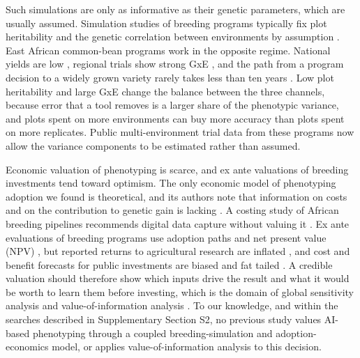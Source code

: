 Such simulations are only as informative as their genetic parameters, which are usually assumed. Simulation studies of breeding programs typically fix plot heritability and the genetic correlation between environments by assumption \citep{Gorjanc2018Optimal,Lin2023Simulations,Seck2024Stochastic}. East African common-bean programs work in the opposite regime. National yields are low \citep{Beebe2013Phenotyping,Hillocks2006Phaseolus}, regional trials show strong GxE \citep{Amongi2023Gain,Amongi2025Yield}, and the path from a program decision to a widely grown variety rarely takes less than ten years \citep{Kholova2021Pursuit}. Low plot heritability and large GxE change the balance between the three channels, because error that a tool removes is a larger share of the phenotypic variance, and plots spent on more environments can buy more accuracy than plots spent on more replicates. Public multi-environment trial data from these programs now allow the variance components to be estimated rather than assumed.

Economic valuation of phenotyping is scarce, and ex ante valuations of breeding investments tend toward optimism. The only economic model of phenotyping adoption we found is theoretical, and its authors note that information on costs and on the contribution to genetic gain is lacking \citep{Awada2018Adoption}. A costing study of African breeding pipelines recommends digital data capture without valuing it \citep{Das2025Costing}. Ex ante evaluations of breeding programs use adoption paths and net present value (NPV) \citep{Staver2020ExAnte,Grovermann2022Three,Janssen2018Costbenefit}, but reported returns to agricultural research are inflated \citep{Hurley2014Reexamining}, and cost and benefit forecasts for public investments are biased and fat tailed \citep{Flyvbjerg2021Costbenefit}. A credible valuation should therefore show which inputs drive the result and what it would be worth to learn them before investing, which is the domain of global sensitivity analysis \citep{Saltelli2010Variance} and value-of-information analysis \citep{Claxton2001Bayesian,Strong2013Estimating}. To our knowledge, and within the searches described in Supplementary Section S2, no previous study values AI-based phenotyping through a coupled breeding-simulation and adoption-economics model, or applies value-of-information analysis to this decision.

